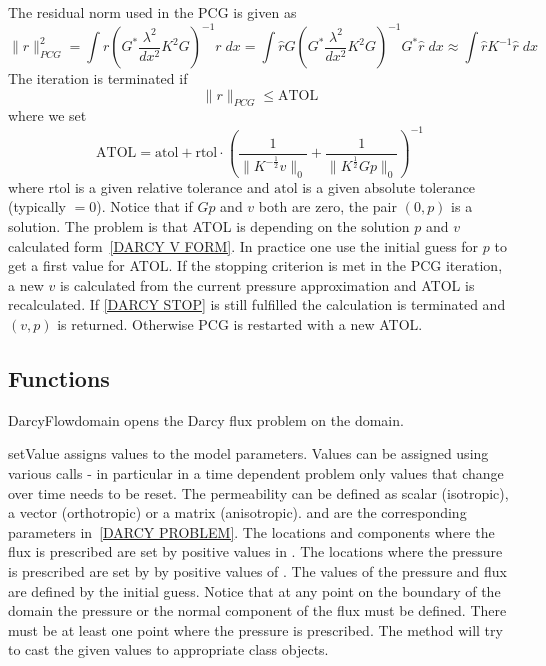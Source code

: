 The residual norm used in the PCG is given as
\begin{equation}\label{DARCY R NORM}
\|r\|_{PCG}^2 = \int r (G^* \frac{\lambda^2}{dx^2} K^2 G)^{-1} r \; dx =\int \hat{r}  G ( G^* \frac{\lambda^2}{dx^2} K^2 G)^{-1}  G^* \hat{r} \; dx \approx
\int \hat{r} K^{-1}  \hat{r} \; dx 
\end{equation}
The iteration is terminated if 
\begin{equation}\label{DARCY STOP}
\|r\|_{PCG} \le \mbox{ATOL}
\end{equation}
where we set 
\begin{equation}\label{DARCY ATOL DEF}
\mbox{ATOL} = \mbox{atol} + \mbox{rtol} \cdot \left(\frac{1}{\|K^{-\frac{1}{2}}v\|_{0}} + \frac{1}{\|K^{\frac{1}{2}} G p\|_{0}} \right)^{-1} 
\end{equation}
where rtol is a given relative tolerance and $\mbox{atol}$ is a given absolute tolerance (typically $=0$).  
Notice that if $Gp$ and $v$ both are zero, the pair $(0,p)$ is a solution.
The problem is that ATOL is depending on the solution $p$ and $v$ calculated form~\ref{DARCY V FORM}. 
In practice one use the initial guess for $p$ 
to get a first value for ATOL. If the stopping criterion is met in the PCG iteration, a new $v$ is calculated from the current pressure approximation and ATOL is recalculated. If \ref{DARCY STOP} is still fulfilled the calculation is terminated and $(v,p)$ is returned. Otherwise PCG is restarted with a new ATOL.

\subsection{Functions}
\begin{classdesc}{DarcyFlow}{domain}
opens the Darcy flux problem on the \Domain domain.
\end{classdesc}

\begin{methoddesc}[DarcyFlow]{setValue}{}
assigns values to the model parameters. Values can be assigned using various calls - in particular 
in a time dependent problem only values that change over time needs to be reset. The permeability can be defined as scalar (isotropic), a vector (orthotropic) or a matrix (anisotropic). 
 and  are the corresponding parameters in~\ref{DARCY PROBLEM}.
The locations and components where the flux is prescribed are set by positive values in
. 
The locations where the pressure is prescribed are set by 
by positive values of . 
The values of the pressure and flux are defined by the initial guess.
Notice that at any point on the boundary of the domain the pressure or the normal component of
the flux must be defined. There must be at least one point where the pressure is prescribed. 
The method will try to cast the given values to appropriate 
\Data class objects.
\end{methoddesc}

